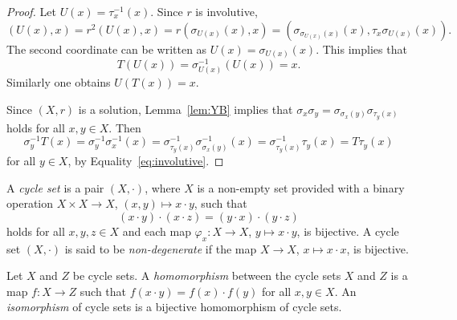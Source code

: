 \begin{proof}
	Let $U(x)=\tau_x^{-1}(x)$. Since $r$ is involutive, 
	\[
	(U(x),x)=r^2(U(x),x)=r(\sigma_{U(x)}(x),x)=(\sigma_{\sigma_{U(x)}(x)}(x),\tau_x\sigma_{U(x)}(x)).
	\]
	The second coordinate can be written as $U(x)=\sigma_{U(x)}(x)$. This 
	implies that 
	\[
	T(U(x))=\sigma^{-1}_{U(x)}(U(x))=x.
	\]
	Similarly one obtains $U(T(x))=x$. 
	
	Since $(X,r)$ is a solution, Lemma~\ref{lem:YB} implies that 
	$\sigma_x\sigma_y=\sigma_{\sigma_x(y)}\sigma_{\tau_y(x)}$
	holds for all $x,y\in X$. Then  
	\[
	\sigma_y^{-1}T(x)
	=\sigma_y^{-1}\sigma_x^{-1}(x)
	=\sigma^{-1}_{\tau_y(x)}\sigma^{-1}_{\sigma_x(y)}(x)
	=\sigma^{-1}_{\tau_y(x)}\tau_y(x)
	=T\tau_y(x)
	\]
	for all $y\in X$, by Equality~\eqref{eq:involutive}.
\end{proof}



\begin{definition}
	A \emph{cycle set} is a pair $(X,\cdot)$, where $X$ is a non-empty 
	set provided with a binary operation $X\times X\to X$, $(x,y)\mapsto x\cdot y$, 
	such that 
	\begin{equation}
		\label{eq:cycle_set}
		(x\cdot y)\cdot (x\cdot z)=(y\cdot x)\cdot (y\cdot z)
	\end{equation}
	holds for all $x,y,z\in X$ and each map $\varphi_x\colon X\to X$, $y\mapsto x\cdot y$, is bijective. 
	A cycle set $(X,\cdot)$ is said to be \emph{non-degenerate} 
	if the map $X\to X$, $x\mapsto x\cdot x$, is bijective. 
\end{definition}

\begin{definition}
	Let $X$ and $Z$ be cycle sets. 
	A \emph{homomorphism} between the cycle sets $X$ and $Z$ is a 
	map $f\colon X\to Z$ such that $f(x\cdot y)=f(x)\cdot f(y)$ for all $x,y\in X$. An \emph{isomorphism} of cycle sets
	is a bijective homomorphism of cycle sets. 
\end{definition}




